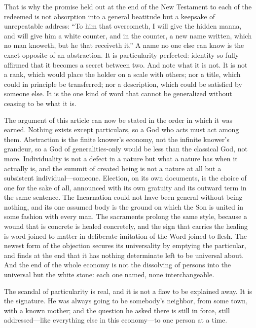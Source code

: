 That is why the promise held out at the end of the New Testament to each of the redeemed is not absorption into a general beatitude but a keepsake of unrepeatable address: ``To him that overcometh, I will give the hidden manna, and will give him a white counter, and in the counter, a new name written, which no man knoweth, but he that receiveth it.'' A name no one else can know is the exact opposite of an abstraction. It is particularity perfected: identity so fully affirmed that it becomes a secret between two. And note what it is not. It is not a rank, which would place the holder on a scale with others; nor a title, which could in principle be transferred; nor a description, which could be satisfied by someone else. It is the one kind of word that cannot be generalized without ceasing to be what it is.

The argument of this article can now be stated in the order in which it was earned. Nothing exists except particulars, so a God who acts must act among them. Abstraction is the finite knower's economy, not the infinite knower's grandeur, so a God of generalities-only would be less than the classical God, not more. Individuality is not a defect in a nature but what a nature has when it actually is, and the summit of created being is not a nature at all but a subsistent individual---someone. Election, on its own documents, is the choice of one for the sake of all, announced with its own gratuity and its outward term in the same sentence. The Incarnation could not have been general without being nothing, and its one assumed body is the ground on which the Son is united in some fashion with every man. The sacraments prolong the same style, because a wound that is concrete is healed concretely, and the sign that carries the healing is word joined to matter in deliberate imitation of the Word joined to flesh. The newest form of the objection secures its universality by emptying the particular, and finds at the end that it has nothing determinate left to be universal about. And the end of the whole economy is not the dissolving of persons into the universal but the white stone: each one named, none interchangeable.

The scandal of particularity is real, and it is not a flaw to be explained away. It is the signature. He was always going to be somebody's neighbor, from some town, with a known mother; and the question he asked there is still in force, still addressed---like everything else in this economy---to one person at a time.
